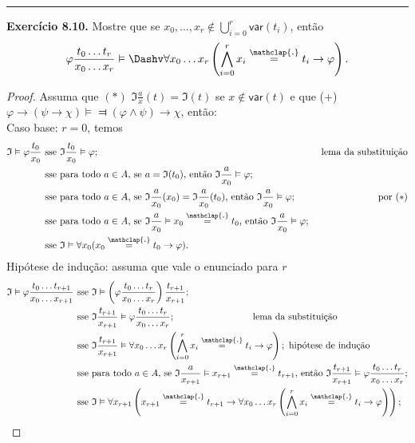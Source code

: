 \documentclass[11pt]{article}
\theoremstyle{definition}
\newcommand{\mf}[1]{\mathfrak{#1}}
\newcommand{\msf}[1]{\mathsf{#1}}
\newcommand\overtext[2]{\stackrel{\mathclap{\normalfont\mbox{#1}}}{#2}}
\begin{document}
\hrule

\textbf{Exercício 8.10.} Mostre que se $x_0,\dots,x_r\notin\bigcup_{i=0}^r\msf{var}(t_i)$, então
$$\varphi\frac{t_0\dots t_r}{x_0\dots x_r}\vDash\Dashv\forall x_0\dots x_r\left(\bigwedge_{i=0}^rx_i\overtext{.}{=}t_i\rightarrow\varphi\right).$$

\begin{proof}
    Assuma que $(*)$ $\mf{I}\frac{a}{x}(t)=\mf{I}(t)$ se $x\notin\msf{var}(t)$ e que (+) $\varphi\rightarrow(\psi\rightarrow\chi)\vDash\Dashv(\varphi\wedge\psi)\rightarrow\chi$, então:\\
    Caso base: $r = 0$, temos
    \begin{align*}
        \mf{I}\vDash\varphi\frac{t_0}{x_0} & \text{ sse }\mf{I}\frac{t_0}{x_0}\vDash\varphi; & \text{ lema da substituição}\\
        & \text{ sse para todo }a\in A\text{, se }a=\mf{I}(t_0)\text{, então }\mf{I}\frac{a}{x_0}\vDash\varphi; &  \\
        & \text{ sse para todo }a\in A\text{, se }\mf{I}\frac{a}{x_0}(x_0)=\mf{I}\frac{a}{x_0}(t_0)\text{, então }\mf{I}\frac{a}{x_0}\vDash\varphi; & \text{ por }(*)\\
        & \text{ sse para todo }a\in A\text{, se }\mf{I}\frac{a}{x_0}\vDash x_0\overtext{.}{=}t_0\text{, então }\mf{I}\frac{a}{x_0}\vDash\varphi; &\\
        & \text{ sse }\mf{I}\vDash\forall x_0(x_0\overtext{.}{=}t_0\rightarrow\varphi). &
    \end{align*}
    Hipótese de indução: assuma que vale o enunciado para $r$
    \begin{align*}
        \mf{I}\vDash\varphi\frac{t_0\dots t_{r+1}}{x_0\dots x_{r+1}} & \text{ sse }\mf{I}\vDash\left(\varphi\frac{t_0\dots t_r}{x_0\dots x_r}\right)\frac{t_{r+1}}{x_{r+1}};\\
        & \text{ sse }\mf{I}\frac{t_{r+1}}{x_{r+1}}\vDash\varphi\frac{t_0\dots t_r}{x_0\dots x_r};~~~~~~~~~~~~~~~~~~~~~~~~\text{ lema da substituição}\\
        & \text{ sse }\mf{I}\frac{t_{r+1}}{x_{r+1}}\vDash\forall x_0\dots x_r\left(\bigwedge_{i=0}^rx_i\overtext{.}{=}t_i\rightarrow\varphi\right);\text{ hipótese de indução}\\
        & \text{ sse para todo }a\in A\text{, se }\mf{I}\frac{a}{x_{r+1}}\vDash x_{r+1}\overtext{.}{=}t_{r+1}\text{, então }\mf{I}\frac{t_{r+1}}{x_{r+1}}\vDash\varphi\frac{t_0\dots t_r}{x_0\dots x_r};\\
        & \text{ sse }\mf{I}\vDash\forall x_{r+1}\left(x_{r+1}\overtext{.}{=}t_{r+1}\rightarrow\forall x_0\dots x_r\left(\bigwedge_{i=0}^rx_i\overtext{.}{=}t_i\rightarrow\varphi\right)\right);\\

\end{align*}
\end{proof}
\end{document}
